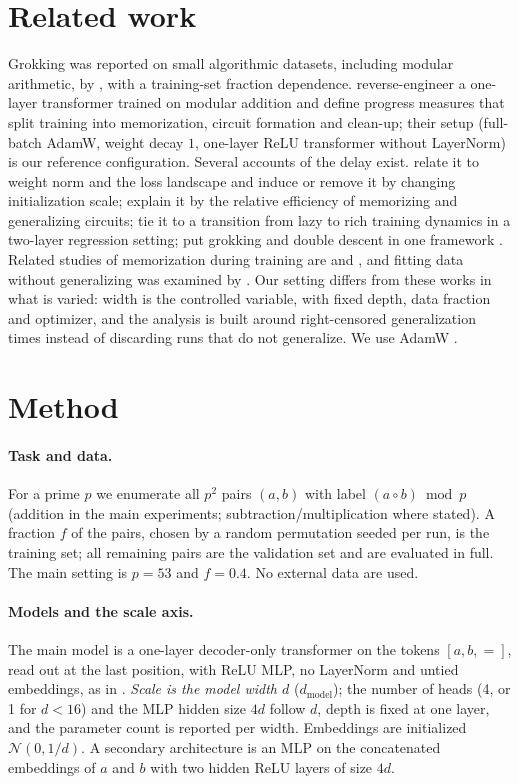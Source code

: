 \documentclass{article}
\begin{document}
\section{Related work}
\label{sec:related}
Grokking was reported on small algorithmic datasets, including modular arithmetic, by \citet{power2022grokking}, with a training-set fraction dependence.
\citet{nanda2023progress} reverse-engineer a one-layer transformer trained on modular addition and define progress measures that split training into memorization, circuit formation and clean-up; their setup (full-batch AdamW, weight decay $1$, one-layer ReLU transformer without LayerNorm) is our reference configuration.
Several accounts of the delay exist.
\citet{liu2023omnigrok} relate it to weight norm and the loss landscape and induce or remove it by changing initialization scale;
\citet{varma2023circuit} explain it by the relative efficiency of memorizing and generalizing circuits;
\citet{kumar2024grokking} tie it to a transition from lazy to rich training dynamics in a two-layer regression setting;
\citet{davies2023unifying} put grokking and double descent in one framework \citep[see also][]{nakkiran2020deep}.
Related studies of memorization during training are \citet{tirumala2022memorization} and \citet{morris2025memorize}, and fitting data without generalizing was examined by \citet{zhang2017rethinking}.
Our setting differs from these works in what is varied: width is the controlled variable, with fixed depth, data fraction and optimizer, and the analysis is built around right-censored generalization times instead of discarding runs that do not generalize.
We use AdamW \citep{loshchilov2017decoupled}.


\section{Method}
\label{sec:method}
\paragraph{Task and data.}
For a prime $p$ we enumerate all $p^2$ pairs $(a,b)$ with label $(a\circ b)\bmod p$ (addition in the main experiments; subtraction/multiplication where stated).
A fraction $f$ of the pairs, chosen by a random permutation seeded per run, is the training set; all remaining pairs are the validation set and are evaluated in full.
The main setting is $p=53$ and $f=0.4$. No external data are used.

\paragraph{Models and the scale axis.}
The main model is a one-layer decoder-only transformer on the tokens $[a,b,=]$, read out at the last position, with ReLU MLP, no LayerNorm and untied embeddings, as in \citet{nanda2023progress}.
\emph{Scale is the model width $d$} ($d_{\text{model}}$); the number of heads (4, or 1 for $d<16$) and the MLP hidden size $4d$ follow $d$, depth is fixed at one layer, and the parameter count is reported per width.
Embeddings are initialized $\mathcal N(0,1/d)$.
A secondary architecture is an MLP on the concatenated embeddings of $a$ and $b$ with two hidden ReLU layers of size $4d$.
\end{document}
